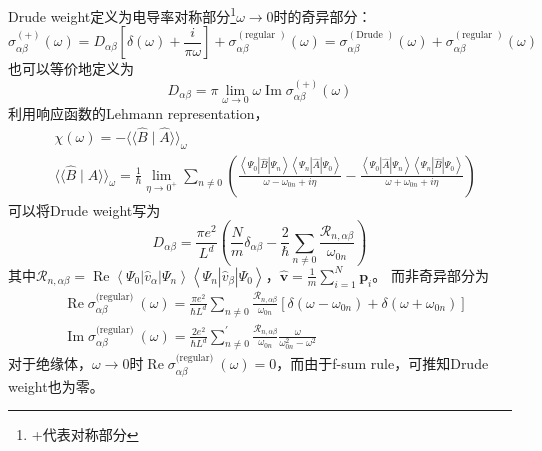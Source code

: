 \documentclass[10pt,openany]{book}
\theoremstyle{thmstyle} %
\theoremstyle{defstyle} %
\theoremstyle{prostyle} %
\begin{document}
Drude weight定义为电导率对称部分\footnote{+代表对称部分}$ \omega \to 0 $时的奇异部分：
\begin{equation}
  \sigma_{\alpha \beta}^{(+)}(\omega)=D_{\alpha \beta}\left[\delta(\omega)+\frac{i}{\pi \omega}\right]+\sigma_{\alpha \beta}^{(\text {regular })}(\omega)=\sigma_{\alpha \beta}^{(\text {Drude })}(\omega)+\sigma_{\alpha \beta}^{(\text {regular })}(\omega)
\end{equation} 
也可以等价地定义为
\begin{equation}
  D_{\alpha \beta}=\pi \lim _{\omega \rightarrow 0} \omega \operatorname{Im} \sigma_{\alpha \beta}^{(+)}(\omega)
\end{equation}
利用响应函数的Lehmann representation，
\begin{equation}
  \begin{aligned}
    & \chi(\omega)=-\langle\langle\hat{B} \mid \hat{A}\rangle\rangle_\omega \\
    & \langle\langle\hat{B} \mid \hat{A}\rangle\rangle_\omega=\frac{1}{\hbar} \lim _{\eta \rightarrow 0^{+}} \sum_{n \neq 0}\left(\frac{\left\langle\Psi_0|\hat{B}| \Psi_n\right\rangle\left\langle\Psi_n|\hat{A}| \Psi_0\right\rangle}{\omega-\omega_{0 n}+i \eta}-\frac{\left\langle\Psi_0|\hat{A}| \Psi_n\right\rangle\left\langle\Psi_n|\hat{B}| \Psi_0\right\rangle}{\omega+\omega_{0 n}+i \eta}\right)
    \end{aligned}
\end{equation}
可以将Drude weight写为
\begin{equation}
  D_{\alpha \beta}=\frac{\pi e^2}{L^d}\left(\frac{N}{m} \delta_{\alpha \beta}-\frac{2}{\hbar} \sum_{n \neq 0} \frac{\mathcal{R}_{n, \alpha \beta}}{\omega_{0 n}}\right)
\end{equation}
其中$ \mathcal{R}_{n, \alpha \beta}=\operatorname{Re}\left\langle\Psi_0\left|\hat{v}_\alpha\right| \Psi_n\right\rangle\left\langle\Psi_n\left|\hat{v}_\beta\right| \Psi_0\right\rangle $，$ \hat{\mathbf{v}}=\frac{1}{m} \sum_{i=1}^N \mathbf{p}_i $。
而非奇异部分为
\begin{equation}
  \begin{aligned}
    & \operatorname{Re} \sigma_{\alpha \beta}^{(\text {regular) }}(\omega)=\frac{\pi e^2}{\hbar L^d} \sum_{n \neq 0} \frac{\mathcal{R}_{n, \alpha \beta}}{\omega_{0 n}}\left[\delta\left(\omega-\omega_{0 n}\right)+\delta\left(\omega+\omega_{0 n}\right)\right] \\
    & \operatorname{Im} \sigma_{\alpha \beta}^{(\text {regular) }}(\omega)=\frac{2 e^2}{\hbar L^d} \sum_{n \neq 0}^{\prime} \frac{\mathcal{R}_{n, \alpha \beta}}{\omega_{0 n}} \frac{\omega}{\omega_{0 n}^2-\omega^2}
    \end{aligned}
\end{equation}
对于绝缘体，$ \omega \to 0 $时$ \operatorname{Re} \sigma_{\alpha \beta}^{(\text {regular) }}(\omega)=0 $，而由于f-sum rule，可推知Drude weight也为零。 
\end{document}
